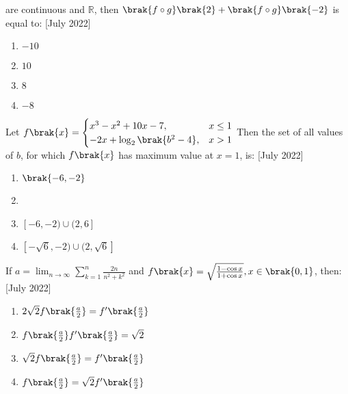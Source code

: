      are continuous and $\mathbb{R}$, then $\brak{f \circ g}\brak{2} + \brak{f\circ g}\brak{-2}$ is equal to: \hfill{[July 2022]}
    \begin{multicols}{2}
        \begin{enumerate}
            \item $-10$
            \item $10$
            \item $8$
            \item $-8$
        \end{enumerate}
    \end{multicols}
    \item Let $
        f\brak{x} = 
            \begin{cases}
                x^3 - x^2 + 10x - 7, &x\leq 1 \\
                -2x + \log_{2} \brak{b^2 - 4},&x>1
            \end{cases}
        $
        Then the set of all values of $b$, for which $f\brak{x}$ has maximum value at $x=1$, is: \hfill{[July 2022]}
        \begin{multicols}{2}
            \begin{enumerate}
                \item $\brak{-6,-2}$
                \item {}
                \item $[-6,-2)\cup(2,6]$
                \item $[-\sqrt{6},-2)\cup(2,\sqrt{6}]$
            \end{enumerate}
        \end{multicols}
        \item If $a = \lim_{n \to \infty} \sum_{k=1}^{n} \frac{2n}{n^2 + k^2}$ and $f\brak{x} = \sqrt{\frac{1 - \cos{x}}{1 + \cos{x}}},x \in \brak{0,1}$, then: \hfill{[July 2022]}
        \begin{multicols}{2}
            \begin{enumerate}
                \item $2\sqrt{2}f\brak{\frac{a}{2}} = f^{\prime}\brak{\frac{a}{2}}$
                \item $f\brak{\frac{a}{2}} f^{\prime}\brak{\frac{a}{2}} = \sqrt{2}$
                \item $\sqrt{2}f\brak{\frac{a}{2}} = f^{\prime}\brak{\frac{a}{2}}$
                \item $f\brak{\frac{a}{2}} = \sqrt{2}f^{\prime}\brak{\frac{a}{2}}$
            \end{enumerate}
        \end{multicols}
